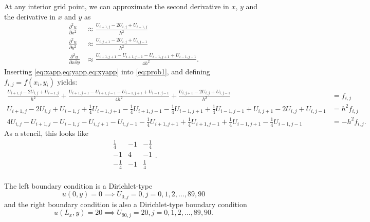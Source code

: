 \begin{derivation}
    At any interior grid point, we can approximate the second derivative in $x$, $y$ and the derivative in $x$ and $y$ as
    \begin{align}
      \frac{\partial ^2 u}{\partial x^2} &\approx \frac{U_{i+1,j} - 2U_{i,j} + U_{i-1,j}}{h^2} \label{eq:xapp}\\
      \frac{\partial ^2 u}{\partial y^2} &\approx \frac{U_{i,j+1} - 2U_{i,j} + U_{i,j-1}}{h^2} \label{eq:yapp}\\
      \frac{\partial ^2 u}{\partial x \partial y} &\approx \frac{U_{i+1,j+1} - U_{i+1,j-1} - U_{i-1,j+1} + U_{i-1,j-1}}{4h^2} \label{eq:xyapp}
    .\end{align}
    Inserting \cref{eq:xapp,eq:yapp,eq:xyapp} into \cref{eq:prob1}, and defining $f_{i,j} = f(x_i, y_i)$ yields:
    \begin{align}
      \frac{U_{i+1,j} - 2U_{i,j} + U_{i-1,j}}{h^2} + \frac{U_{i+1,j+1} - U_{i+1,j-1} - U_{i-1,j+1} + U_{i-1, j-1}}{4h^2} + \frac{U_{i,j+1} - 2U_{i,j} + U_{i,j-1}}{h^2} &= f_{i,j} \nonumber\\
      U_{i+1,j} - 2U_{i,j} + U_{i-1,j} + \frac{1}{4} U_{i+1,j+1} - \frac{1}{4} U_{i+1,j-1} - \frac{1}{4} U_{i-1,j+1} + \frac{1}{4} U_{i-1,j-1} + U_{i,j+1} - 2U_{i,j} + U_{i,j-1} &= h^2 f_{i,j} \nonumber\\
      4U_{i,j} - U_{i+1,j} - U_{i-1, j} - U_{i,j+1} - U_{i,j-1} - \frac{1}{4} U_{i+1,j+1} + \frac{1}{4} U_{i+1,j-1} + \frac{1}{4} U_{i-1, j+1} - \frac{1}{4} U_{i-1,j-1} &= - h^2 f_{i,j}
    .\end{align}
    As a stencil, this looks like
    \begin{equation*}
      \begin{array}{ccc}
        \frac{1}{4} & -1 & - \frac{1}{4}\\
      -1 & 4 & -1\\
      - \frac{1}{4} & -1 & \frac{1}{4}\\
      \end{array}
    .\end{equation*}

    The left boundary condition is a Dirichlet-type
    \begin{equation}
      u(0,y) = 0 \implies U_{0,j} = 0, j = 0,1,2,\ldots ,89,90
    \end{equation}
    and the right boundary condition is also a Dirichlet-type boundary condition
    \begin{equation}
      u(L_x, y) = 20 \implies U_{90,j} = 20, j = 0,1,2,\ldots ,89,90
    .\end{equation}
    

\end{derivation}
